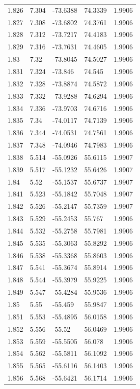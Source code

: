 \begin{tabular}{lllll}
1.826 & 7.304 & -73.6388 & 74.3339 & 1.9906 \\
1.827 & 7.308 & -73.6802 & 74.3761 & 1.9906 \\
1.828 & 7.312 & -73.7217 & 74.4183 & 1.9906 \\
1.829 & 7.316 & -73.7631 & 74.4605 & 1.9906 \\
1.83 & 7.32 & -73.8045 & 74.5027 & 1.9906 \\
1.831 & 7.324 & -73.846 & 74.545 & 1.9906 \\
1.832 & 7.328 & -73.8874 & 74.5872 & 1.9906 \\
1.833 & 7.332 & -73.9288 & 74.6294 & 1.9906 \\
1.834 & 7.336 & -73.9703 & 74.6716 & 1.9906 \\
1.835 & 7.34 & -74.0117 & 74.7139 & 1.9906 \\
1.836 & 7.344 & -74.0531 & 74.7561 & 1.9906 \\
1.837 & 7.348 & -74.0946 & 74.7983 & 1.9906 \\
1.838 & 5.514 & -55.0926 & 55.6115 & 1.9907 \\
1.839 & 5.517 & -55.1232 & 55.6426 & 1.9907 \\
1.84 & 5.52 & -55.1537 & 55.6737 & 1.9907 \\
1.841 & 5.523 & -55.1842 & 55.7048 & 1.9907 \\
1.842 & 5.526 & -55.2147 & 55.7359 & 1.9907 \\
1.843 & 5.529 & -55.2453 & 55.767 & 1.9906 \\
1.844 & 5.532 & -55.2758 & 55.7981 & 1.9906 \\
1.845 & 5.535 & -55.3063 & 55.8292 & 1.9906 \\
1.846 & 5.538 & -55.3368 & 55.8603 & 1.9906 \\
1.847 & 5.541 & -55.3674 & 55.8914 & 1.9906 \\
1.848 & 5.544 & -55.3979 & 55.9225 & 1.9906 \\
1.849 & 5.547 & -55.4284 & 55.9536 & 1.9906 \\
1.85 & 5.55 & -55.459 & 55.9847 & 1.9906 \\
1.851 & 5.553 & -55.4895 & 56.0158 & 1.9906 \\
1.852 & 5.556 & -55.52 & 56.0469 & 1.9906 \\
1.853 & 5.559 & -55.5505 & 56.078 & 1.9906 \\
1.854 & 5.562 & -55.5811 & 56.1092 & 1.9906 \\
1.855 & 5.565 & -55.6116 & 56.1403 & 1.9906 \\
1.856 & 5.568 & -55.6421 & 56.1714 & 1.9906 \\

\end{tabular}
